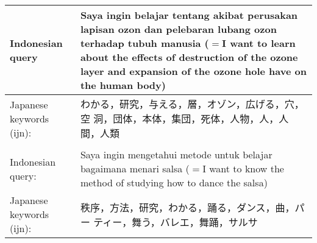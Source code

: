 \documentclass[english]{jnlp_1.3c}
\begin{document}
\begin{table}[t]
  \label{table:8}
    \begin{tabular}{|l|l|}\hline
     \multicolumn{1}{|p{13em}|}{Indonesian query}
     &    \multicolumn{1}{|p{30em}|}{Saya ingin belajar tentang akibat
     perusakan lapisan ozon dan pelebaran lubang 
     ozon terhadap tubuh manusia ($=$I want to learn about the
     effects of destruction of the ozone layer and expansion of the ozone
     hole have on the human body)}   \\  \hline
      \multicolumn{1}{|p{13em}|}{Japanese keywords (ijn):}
     &    \multicolumn{1}{|p{30em}|}{わかる，研究，与える，層，オゾン，広げる，穴，空
     洞，団体，本体，集団，死体，人物，人，人間，人類}   \\  \hline
     \multicolumn{2}{|l|}{} \\ \hline
     \multicolumn{1}{|p{13em}|}{Indonesian query:}
     &    \multicolumn{1}{|p{30em}|}{Saya ingin mengetahui metode untuk
     belajar bagaimana menari salsa ($=$I want to know the method of
     studying how to dance the salsa)}   \\  \hline
       \multicolumn{1}{|p{13em}|}{Japanese keywords (ijn):}
     &    \multicolumn{1}{|p{30em}|}{秩序，方法，研究，わかる，踊る，ダンス，曲，パー
     ティー，舞う，バレエ，舞踊，サルサ}   \\  \hline
    \end{tabular}
\end{table}
\end{document}
